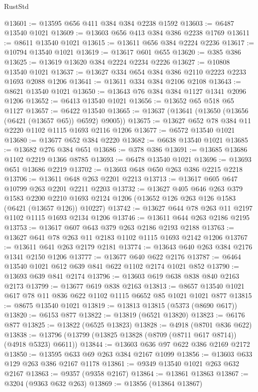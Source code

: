 \begin{lexlean}{RustStd}
\begin{coremodule}
@13601 := @13595 @656 @411 @384 @384 @2238 @1592
@13603 := @6487 @13540 @1021
@13609 := @13603 @656 @413 @384 @386 @2238 @1769
@13611 := @8611 @13540 @1021
@13615 := @13611 @656 @384 @2224 @2236
@13617 := @10794 @13540 @1021
@13619 := @13617 @601 @655
@13620 := @385 @386
@13625 := @13619 @13620 @384 @2224 @2234 @2226
@13627 := @10808 @13540 @1021
@13637 := @13627 @334 @654 @384 @386 @2110 @2223 @2233 @1693 @2088 @1206
@13641 := @13611 @334 @384 @2106 @2108
@13643 := @8621 @13540 @1021
@13650 := @13643 @76 @384 @384 @1127 @1341 @2096 @1206
@13652 := @6413 @13540 @1021
@13656 := @13652 @65 @518 @65 @1127
@13657 := @6422 @13540
@13665 := @13637 (@13641 (@13650 (@13656 (@6421 (@13657 @65)) @6592) @9005))
@13675 := @13627 @652 @78 @384 @11 @2220 @1102 @1115 @1693 @2116 @1206
@13677 := @6572 @13540 @1021
@13680 := @13677 @652 @384 @2220
@13682 := @6638 @13540 @1021
@13685 := @13682 @276 @384 @651
@13686 := @378 @386
@13691 := @13685 @13686 @1102 @2219 @1366 @8785
@13693 := @6478 @13540 @1021
@13696 := @13693 @651 @13686 @2219
@13702 := @13603 @648 @650 @263 @386 @2215 @2218
@13706 := @13611 @648 @263 @2201 @2213
@13713 := @13617 @605 @647 @10799 @263 @2201 @2211 @2203
@13732 := @13627
    @405
    @646
    @263
    @379
    @1583
    @2200
    @2210
    @1693
    @2124
    @1206
    (@13652 @126 @263 @126 @1583 (@6421 (@13657 @126)) @10227)
@13742 := @13627 @644 @78 @263 @11 @2197 @1102 @1115 @1693 @2134 @1206
@13746 := @13611 @644 @263 @2186 @2195
@13753 := @13617 @607 @643 @379 @263 @2186 @2193 @2188
@13763 := @13627 @641 @78 @263 @11 @2183 @1102 @1115 @1693 @2142 @1206
@13767 := @13611 @641 @263 @2179 @2181
@13774 := @13643 @640 @263 @384 @2176 @1341 @2150 @1206
@13777 := @13677 @640 @622 @2176
@13787 := @6464 @13540 @1021 @612 @639 @841 @622 @1102 @2174 @1021 @852
@13790 := @13693 @639 @841 @2174
@13796 := @13603 @619 @638 @838 @840 @2163 @2173
@13799 := @13677 @619 @838 @2163
@13813 := @8657 @13540 @1021 @617 @78 @11 @836 @622 @1102 @1115 @6652 @85 @1021 @1021 @877
@13815 := @8675 @13540 @1021
@13819 := @13813 @13815 (@5373 (@8690 @617))
@13820 := @6153 @877
@13822 := @13819 (@6521 @13820)
@13823 := @6176 @877
@13825 := @13822 (@6525 @13823)
@13828 := @4918 (@8701 @836 @622)
@13838 := @13796 (@13799 (@13825 @13828 (@8709 (@8711 @617 @8714)) (@4918 @5323) @6611))
@13844 := @13603 @636 @97 @622 @386 @2169 @2172
@13850 := @13595 @633 @69 @263 @384 @2167 @1099
@13856 := @13603 @633 @129 @263 @386 @2167 @1178
@13861 := @9349 @13540 @1021 @263 @632 @2167
@13863 := @9357 (@9358 @2167)
@13864 := @13861 @13863
@13867 := @3204 (@9363 @632 @263)
@13869 := @13856 (@13864 @13867)

\end{coremodule}
\end{lexlean}
